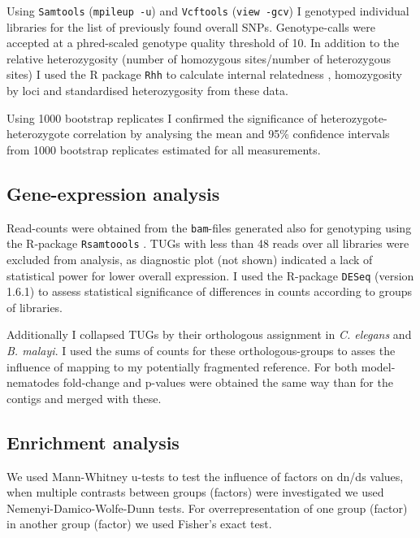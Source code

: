 Using \texttt{Samtools} \cite{journals/bioinformatics/LiHWFRHMAD09}
(\texttt{mpileup -u}) and \texttt{Vcftools} \cite{pmid21653522}
(\texttt{view -gcv}) I genotyped individual libraries for the list of
previously found overall SNPs. Genotype-calls were accepted at a
phred-scaled genotype quality threshold of 10. In addition to the
relative heterozygosity (number of homozygous sites/number of
heterozygous sites) I used the R package \texttt{Rhh}
\cite{pmid21565077} to calculate internal relatedness
\cite{pmid11571049}, homozygosity by loci \cite{pmid17107491} and
standardised heterozygosity \cite{coltman81j} from these data.

Using 1000 bootstrap replicates I confirmed the significance of
heterozygote-heterozygote correlation by analysing the mean and 95\%
confidence intervals from 1000 bootstrap replicates estimated for all
measurements.

\subsection{Gene-expression analysis}

Read-counts were obtained from the \texttt{bam}-files generated also
for genotyping using the R-package \texttt{Rsamtoools}
\cite{rsamtools}. TUGs with less than 48 reads over all libraries were
excluded from analysis, as diagnostic plot (not shown) indicated a
lack of statistical power for lower overall expression. I used the
R-package \texttt{DESeq} \cite{pmid20979621} (version 1.6.1) to assess
statistical significance of differences in counts according to groups
of libraries.

Additionally I collapsed TUGs by their orthologous assignment in
\textit{C. elegans} and \textit{B. malayi}. I used the sums of counts
for these orthologous-groups to asses the influence of mapping to my
potentially fragmented reference. For both model-nematodes fold-change
and p-values were obtained the same way than for the contigs and
merged with these.

\subsection{Enrichment analysis}
\label{GO-over-meth}

We used Mann-Whitney u-tests to test the influence of factors on dn/ds
values, when multiple contrasts between groups (factors) were
investigated we used Nemenyi-Damico-Wolfe-Dunn tests. For
overrepresentation of one group (factor) in another group (factor) we
used Fisher's exact test.

